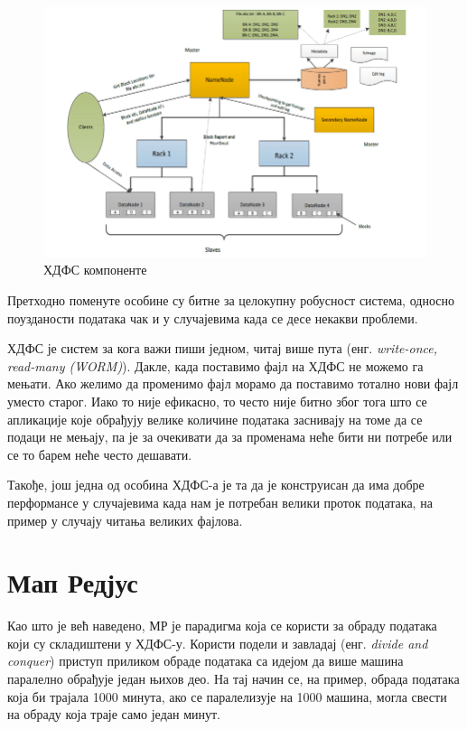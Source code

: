 \documentclass[12pt,oneside]{memoir}
\begin{document}
\begin{figure}[!ht]
  \centering
  \includegraphics[width=1\textwidth]{pictures/hadoop_system.png}
  \caption{ХДФС компоненте}
  \label{fig:hadoop_sistem}
\end{figure}

Претходно поменуте особине су битне за целокупну робусност система, односно поузданости података чак и у случајевима када се десе некакви проблеми.

ХДФС је систем за кога важи пиши једном, читај више пута (енг. \textit{write-once, read-many (WORM)}). Дакле, када поставимо фајл на ХДФС не можемо га мењати. Ако желимо да променимо фајл морамо да поставимо тотално нови фајл уместо старог. Иако то није ефикасно, то често није битно због тога што се апликације које обрађују велике количине података заснивају на томе да се подаци не мењају, па је за очекивати да за променама неће бити ни потребе или се то барем неће често дешавати. \cite{hadoop_beginner}


Такође, још једна од особина ХДФС-а је та да је конструисан да има добре перформансе у случајевима када нам је потребан велики проток података, на пример у случају читања великих фајлова. \cite{hadoop_beginner}


\section{Мап Редјус}
\label{sec:mr}

Као што је већ наведено, МР је парадигма која се користи за обраду података који су складиштени у ХДФС-у. Користи подели и завладај (енг. \textit{divide and conquer}) приступ приликом обраде података са идејом да више машина паралелно обрађује један њихов део. На тај начин се, на пример, обрада података која би трајала 1000 минута, ако се паралелизује на 1000 машина, могла свести на обраду која траје само један минут. \cite{hadoop_beginner}
\end{document}
